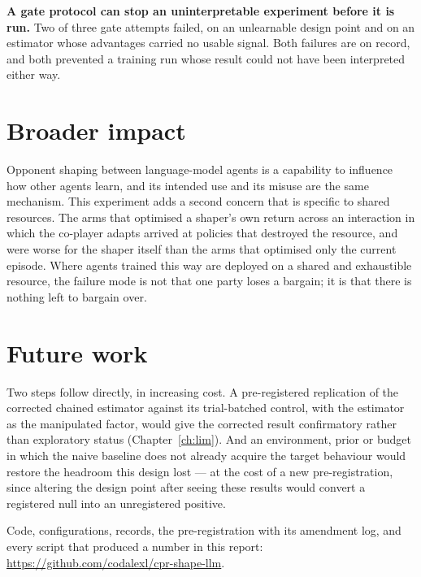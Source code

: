 \textbf{A gate protocol can stop an uninterpretable experiment before it is
run.}
Two of three gate attempts failed, on an unlearnable design point and on an
estimator whose advantages carried no usable signal.
Both failures are on record, and both prevented a training run whose result
could not have been interpreted either way.

\section{Broader impact}
\label{sec:conc-impact}

Opponent shaping between language-model agents is a capability to influence
how other agents learn, and its intended use and its misuse are the same
mechanism.
This experiment adds a second concern that is specific to shared resources.
The arms that optimised a shaper's own return across an interaction in which
the co-player adapts arrived at policies that destroyed the resource, and
were worse for the shaper itself than the arms that optimised only the
current episode.
Where agents trained this way are deployed on a shared and exhaustible
resource, the failure mode is not that one party loses a bargain; it is that
there is nothing left to bargain over.

\section{Future work}
\label{sec:conc-future}

Two steps follow directly, in increasing cost.
A pre-registered replication of the corrected chained estimator against its
trial-batched control, with the estimator as the manipulated factor, would
give the corrected result confirmatory rather than exploratory status
(Chapter~\ref{ch:lim}).
And an environment, prior or budget in which the naive baseline does not
already acquire the target behaviour would restore the headroom this design
lost --- at the cost of a new pre-registration, since altering the design
point after seeing these results would convert a registered null into an
unregistered positive.

Code, configurations, records, the pre-registration with its amendment log,
and every script that produced a number in this report:
\url{https://github.com/codalexl/cpr-shape-llm}.
